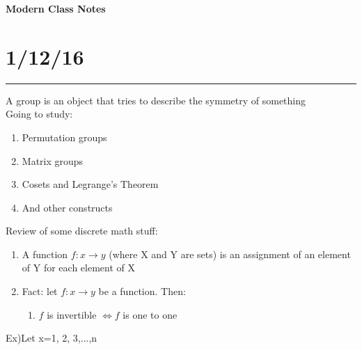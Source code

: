 \documentclass[executivepaper]{extarticle}
\begin{document}
\vspace*{-40mm}

\begin{center}

\textbf{Modern Class Notes}

\end{center}

\section*{1/12/16}

\vspace{-5.5mm}

\noindent \rule{2cm}{0.5pt}

A group is an object that tries to describe the symmetry of something \\

Going to study:

\begin{enumerate}

\item Permutation groups

\item Matrix groups

\item Cosets and Legrange's Theorem

\item And other constructs

\end{enumerate}

Review of some discrete math stuff: \\

\begin{enumerate}

\item A function $f: x \rightarrow y$ (where X and Y are sets) is an assignment of an element of Y for each element of X

\item Fact: let $f: x \rightarrow y$ be a function. Then:

\begin{enumerate}

\item $f$ is invertible $\iff f$ is one to one

\end{enumerate}

\end{enumerate}

Ex)Let x={1, 2, 3,...,n}\\
\end{document}

